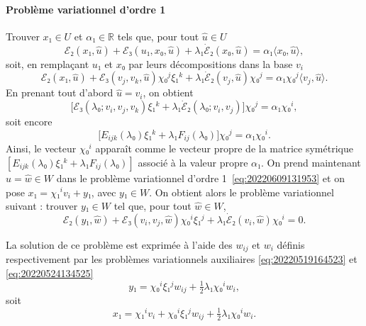 \documentclass[12pt, final]{scrartcl}
\theoremstyle{definition}
\newcommand{\reals}{\mathbb{R}}
\begin{document}
\paragraph{Problème variationnel d'ordre 1} Trouver \(x₁∈U\) et \(α₁∈\reals\)
tels que, pour tout \(\hat{u}∈U\)
\begin{equation}
  \label{eq:20220609131953}
  ℰ₂(x₁, \hat{u}) + ℰ₃(u₁, x₀, \hat{u}) + λ₁ \dot{ℰ}₂(x₀, \hat{u}) = α₁ 〈 x₀, \hat{u} 〉,
\end{equation}
soit, en remplaçant \(u₁\) et \(x₀\) par leurs décompositions dans la base \(v_i\)
\begin{equation}
  ℰ₂(x₁, \hat{u}) + ℰ₃(v_j, v_k, \hat{u}) χ₀^j ξ₁^k + λ₁ \dot{ℰ}₂(v_j, \hat{u}) χ₀^j = α₁ χ₀^j 〈 v_j, \hat{u} 〉.
\end{equation}
En prenant tout d'abord \(\hat{u} = v_i\), on obtient
\begin{equation}
  \bigl[ℰ₃(λ₀; v_i, v_j, v_k) ξ₁^k + λ₁ \dot{ℰ}₂(λ₀; v_i, v_j)\bigr] χ₀^j = α₁ χ₀^i,
\end{equation}
soit encore
\begin{equation}
  \bigl[E_{ijk}(λ₀) ξ₁^k + λ₁ F_{ij}(λ₀)\bigr] χ₀^j = α₁ χ₀^i.
\end{equation}
Ainsi, le vecteur \(χ₀^i\) apparaît comme le vecteur propre de la matrice
symétrique \([E_{ijk}(λ₀) ξ₁^k + λ₁ F_{ij}(λ₀)]\) associé à la valeur propre
\(α₁\).  On prend maintenant \(\hat{u} = \hat{w}∈W\) dans le problème
variationnel d'ordre 1~\eqref{eq:20220609131953} et on pose
\(x₁ = χ₁^i v_i + y₁\), avec \(y₁∈W\). On obtient alors le problème variationnel
suivant : trouver \(y₁∈W\) tel que, pour tout \(\hat{w}∈W\),
\begin{equation}
  ℰ₂(y₁, \hat{w}) + ℰ₃(v_i, v_j, \hat{w}) χ₀^i ξ₁^j + λ₁ \dot{ℰ}₂(v_i, \hat{w}) χ₀^i = 0.
\end{equation}

La solution de ce problème est exprimée à l'aide des \(w_{i j}\) et \(w_i\)
définis respectivement par les problèmes variationnels auxiliaires
\eqref{eq:20220519164523} et \eqref{eq:20220524134525}
\begin{equation}
  y₁ =  χ₀^i ξ₁^j w_{i j} + \tfrac{1}{2} λ₁ χ₀^i w_i,
\end{equation}
soit
\begin{equation}
  \label{eq:20220609133629}
  x₁ = χ₁^i v_i +  χ₀^i ξ₁^j w_{i j} + \tfrac{1}{2} λ₁ χ₀^i w_i.
\end{equation}
\end{document}
